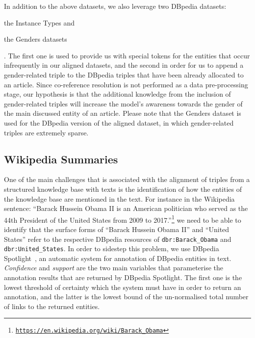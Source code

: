 \documentclass[preprint,5p]{elsarticle}
\begin{document}
In addition to the above datasets, we also leverage two DBpedia datasets:\begin{inparaenum}[(i)]\item the Instance Types and \item the Genders datasets\end{inparaenum}. The first one is used to provide us with special tokens for the entities that occur infrequently in our aligned datasets, and the second in order for us to append a gender-related triple to the DBpedia triples that have been already allocated to an article. Since co-reference resolution is not performed as a data pre-processing stage, our hypothesis is that the additional knowledge from the inclusion of gender-related triples will increase the model's awareness towards the gender of the main discussed entity of an article. Please note that the Genders dataset is used for the DBpedia version of the aligned dataset, in which gender-related triples are extremely sparse.





\subsection{Wikipedia Summaries}
\label{subsec:WikipediaSummaries}
  
One of the main challenges that is associated with the alignment of triples from a structured knowledge base with texts is the identification of how the entities of the knowledge base are mentioned in the text. For instance in the Wikipedia sentence: ``Barack Hussein Obama II is an American politician who served as the 44th President of the United States from 2009 to 2017.''\footnote{\href{https://en.wikipedia.org/wiki/Barack_Obama}{\texttt{https://en.wikipedia.org/wiki/Barack\_Obama}}} we need to be able to identify that the surface forms of ``Barack Hussein Obama II'' and ``United States'' refer to the respective DBpedia resources of \texttt{dbr:Barack\_Obama} and \texttt{dbr:United\_\-States}. In order to sidestep this problem, we use DBpedia Spotlight~\cite{Daiber2013}, an automatic system for annotation of DBpedia entities in text. \textit{Confidence} and \textit{support} are the two main variables that parameterise the annotation results that are returned by DBpedia Spotlight. The first one is the lowest threshold of certainty which the system must have in order to return an annotation, and the latter is the lowest bound of the un-normalised total number of links to the returned entities.
\end{document}
